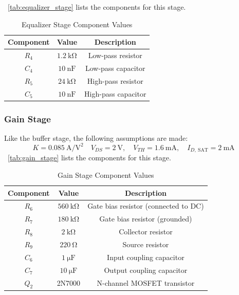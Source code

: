 \documentclass[12pt, a4paper]{article}
\numberwithin{table}{section}
\numberwithin{figure}{section}
\begin{document}
~\autoref{tab:equalizer_stage} lists the components for this stage.

\begin{table}[H]
\centering
\caption{Equalizer Stage Component Values}
\begin{tabular}{|c|c|c|}
\hline
\textbf{Component} & \textbf{Value} & \textbf{Description} \\ \hline
$R_4$ & $1.2~\mathrm{k\Omega}$ & Low-pass resistor\\ \hline
$C_4$ & $10~\mathrm{nF}$ & Low-pass capacitor \\ \hline
$R_5$ & $24~\mathrm{k\Omega}$ & High-pass resistor\\ \hline
$C_5$ & $10~\mathrm{nF}$ & High-pass capacitor\\ \hline
\end{tabular}
\label{tab:equalizer_stage}
\end{table}


\subsubsection{Gain Stage}

Like the buffer stage, the following assumptions are made:
\[K = 0.085~\mathrm{A/V^2}\quad V_{DS} = 2 ~\mathrm{V},\quad V_{TH} = 1.6~\mathrm{mA},\quad I_{D,~\text{SAT}} = 2~\mathrm{mA}\]
~\autoref{tab:gain_stage} lists the components for this stage.

\begin{table}[H]
\centering
\caption{Gain Stage Component Values}
\begin{tabular}{|c|c|c|}
\hline
\textbf{Component} & \textbf{Value} & \textbf{Description} \\ \hline
$R_6$ & $560~\mathrm{k\Omega}$ & Gate bias resistor (connected to DC) \\ \hline
$R_7$ & $180~\mathrm{k\Omega}$ & Gate bias resistor (grounded)\\ \hline
$R_8$ & $2~\mathrm{k\Omega}$ & Collector resistor \\ \hline
$R_9$ & $220~\mathrm{\Omega}$ & Source resistor \\ \hline
$C_6$ & $1~\mathrm{\mu F}$ & Input coupling capacitor \\ \hline
$C_7$ & $10~\mathrm{\mu F}$ & Output coupling capacitor \\ \hline
$Q_2$ & 2N7000 & N-channel MOSFET transistor \\ \hline
\end{tabular}
\label{tab:gain_stage}
\end{table}
\end{document}
